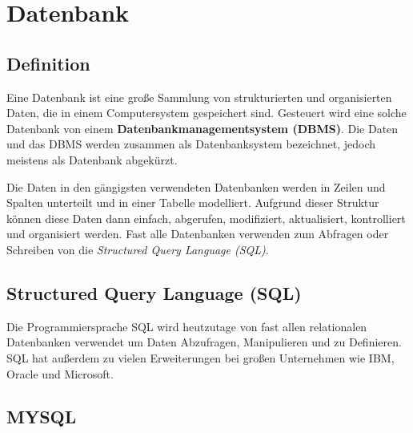 \section{Datenbank}
\subsection{Definition}
Eine Datenbank ist eine große Sammlung von strukturierten und organisierten Daten,
die in einem Computersystem gespeichert sind. Gesteuert wird eine solche Datenbank von
einem \textbf{Datenbankmanagementsystem (DBMS)}. Die Daten und das DBMS werden zusammen als
Datenbanksystem bezeichnet, jedoch meistens als Datenbank abgekürzt.

Die Daten in den gängigsten verwendeten Datenbanken werden in Zeilen und Spalten unterteilt und
in einer Tabelle modelliert. Aufgrund dieser Struktur können diese Daten dann einfach, abgerufen,
modifiziert, aktualisiert, kontrolliert und organisiert werden. Fast alle Datenbanken verwenden
zum Abfragen oder Schreiben von die \textit{Structured Query Language (SQL)}.
\cite{Datenbank}
\subsection{Structured Query Language (SQL)}
Die Programmiersprache SQL wird heutzutage von fast allen relationalen Datenbanken verwendet
um Daten Abzufragen, Manipulieren und zu Definieren. SQL hat außerdem zu vielen Erweiterungen
bei großen Unternehmen wie IBM, Oracle und Microsoft.

\subsection{MYSQL}


\label{db}
